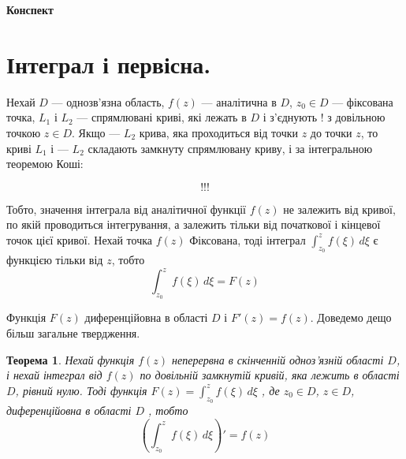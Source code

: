 \documentclass[12pt,fleqn]{article}
\theoremstyle{theorem}
\newtheorem{thm}{Теорема}[section]
\theoremstyle{proof}
\numberwithin{figure}{section}
\numberwithin{equation}{section}
\begin{document}
\vspace{50mm}

\begin{center}
\Large\bf
Конспект\\[50mm]
{\Huge}
\end{center}

\vspace{50mm}

\newpage

\tableofcontents


\newpage


\section{Інтеграл і первісна.}\label{int}\allowdisplaybreaks

Нехай $D$ --- однозв'язна область, $f(z)$ --- аналітична в $D$, $z_0 \in D$ --- фіксована точка, $L_1$ і $L_2$ --- спрямлювані криві, які лежать в $D$ і з'єднують ! з довільною точкою $z \in D$. Якщо --- $L_2$ крива, яка проходиться від точки $z$ до точки $z$, то криві $L_1$ і --- $L_2$ складають замкнуту спрямлювану криву, і за інтегральною теоремою Коші:

\begin{equation}\label{xy}
!!!
\end{equation}

Тобто, значення інтеграла від аналітичної функції $f(z)$ не залежить від кривої, по якій проводиться інтегрування, а залежить тільки від початкової і кінцевої точок цієї кривої. Нехай точка $f(z)$ Фіксована, тоді інтеграл \(\int_{z_0}^{z} f(\xi) \,d\xi \) є функцією тільки від $z$, тобто
\begin{equation}\label{1.2.2}
\int_{z_0}^{z} f(\xi) \,d\xi = F(z)
\end{equation}

Функція $F(z)$ диференційовна в області $D$ і $F'(z)=f(z)$. Доведемо дещо більш загальне твердження.

\begin{thm}\label{theor_l_z}
Нехай функція $f(z)$ неперервна в скінченній одноз'язній області $D$, і нехай інтеграл від $f(z)$ по довільній замкнутій кривій, яка лежить в області $D$, рівний нулю. Тоді функція $F(z)= \int_{z_0}^{z} f(\xi) \,d\xi$ , де $z_0 \in D$, $z \in D$, диференційовна в області $D$ , тобто
\[ \left(\int_{z_0}^{z} f(\xi) \,d\xi\right)' = f(z) \]

\end{thm}
\end{document}

